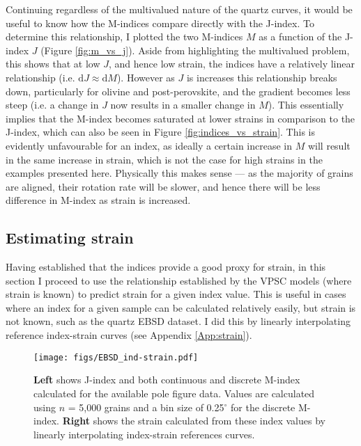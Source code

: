 \documentclass[a4paper,12pt,twoside]{report}
\numberwithin{equation}{chapter}
\begin{document}
Continuing regardless of the multivalued nature of the quartz curves, it would be useful to know how the M-indices compare directly with the J-index. To determine this relationship, I plotted the two M-indices $M$ as a function of the J-index $J$ (Figure \ref{fig:m_vs_j}). Aside from highlighting the multivalued problem, this shows that at low $J$, and hence low strain, the indices have a relatively linear relationship (i.e. $\mathrm{d}J \approx \mathrm{d}M$). However as $J$ is increases this relationship breaks down, particularly for olivine and post-perovskite, and the gradient becomes less steep (i.e. a change in $J$ now results in a smaller change in $M$). This essentially implies that the M-index becomes saturated at lower strains in comparison to the J-index, which can also be seen in Figure \ref{fig:indices_vs_strain}. This is evidently unfavourable for an index, as ideally a certain increase in $M$ will result in the same increase in strain, which is not the case for high strains in the examples presented here. Physically this makes sense --- as the majority of grains are aligned, their rotation rate will be slower, and hence there will be less difference in M-index as strain is increased.  

\subsection{Estimating strain}

Having established that the indices provide a good proxy for strain, in this section I proceed to use the relationship established by the VPSC models (where strain is known) to predict strain for a given index value. This is useful in cases where an index for a given sample can be calculated relatively easily, but strain is not known, such as the quartz EBSD dataset. I did this by linearly interpolating reference index-strain curves (see Appendix \ref{App:strain}).


\begin{figure}[h]
  \centering
    \texttt{[image: figs/EBSD\_ind-strain.pdf]}
  \caption[Relationship of indices to strain (quartz EBSD)]{\textbf{Left} shows J-index and both continuous and discrete M-index calculated for the available pole figure data. Values are calculated using $n$ = 5,000 grains and a bin size of 0.25$^\circ$ for the discrete M-index. \textbf{Right} shows the strain calculated from these index values by linearly interpolating index-strain references curves.} 
  \label{fig:indices_vs_strain_qtz_EBSD}
\end{figure} 
\end{document}
